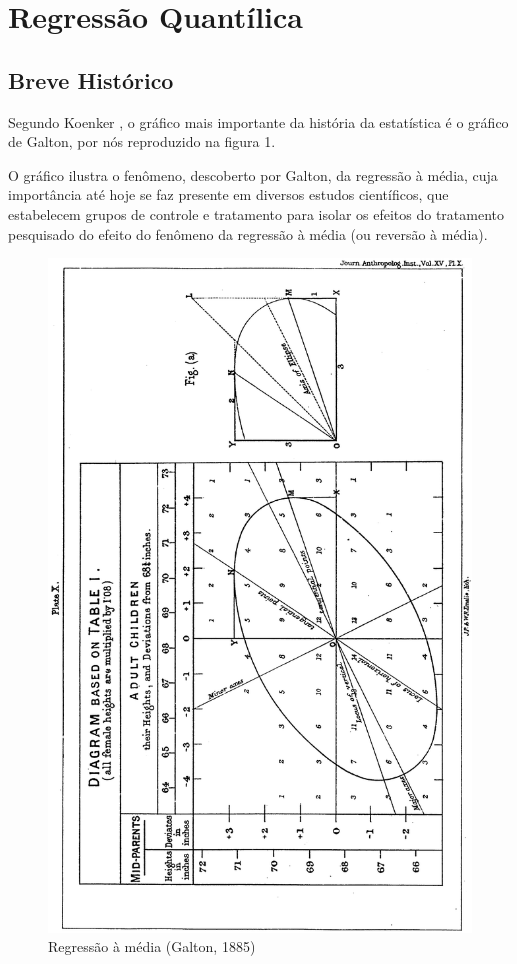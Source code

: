 \documentclass[a4paper, 12pt]{article}
\begin{document}
\hypertarget{regressao-quantilica}{%
\section{Regressão Quantílica}\label{regressao-quantilica}}

\hypertarget{breve-historico}{%
\subsection{Breve Histórico}\label{breve-historico}}

\textcite{stigler1986}

Segundo Koenker \autocite*[371]{mim}, o gráfico mais importante da
história da estatística é o gráfico de Galton, por nós reproduzido na
figura 1.

O gráfico ilustra o fenômeno, descoberto por Galton, da regressão à
média, cuja importância até hoje se faz presente em diversos estudos
científicos, que estabelecem grupos de controle e tratamento para isolar
os efeitos do tratamento pesquisado do efeito do fenômeno da regressão à
média (ou reversão à média).

\begin{figure}
\centering
\includegraphics{image_Galton.png}
\caption{Regressão à média (Galton, 1885)}
\end{figure}
\end{document}

